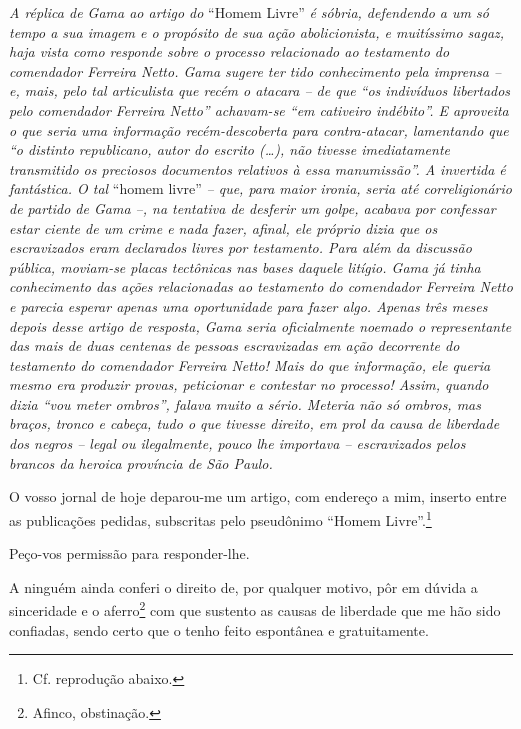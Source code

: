 \begin{didascalia}
\emph{A réplica de Gama ao artigo do} ``Homem Livre'' \emph{é sóbria,
defendendo a um só tempo a sua imagem e o propósito de sua ação
abolicionista, e muitíssimo sagaz, haja vista como responde sobre o
processo relacionado ao testamento do comendador Ferreira Netto. Gama
sugere ter tido conhecimento pela imprensa -- e, mais, pelo tal
articulista que recém o atacara -- de que ``os indivíduos libertados pelo
comendador Ferreira Netto'' achavam-se ``em cativeiro indébito''. E
aproveita o que seria uma informação recém-descoberta para
contra-atacar, lamentando que ``o distinto republicano, autor do escrito
(\ldots{}), não tivesse imediatamente transmitido os preciosos documentos
relativos à essa manumissão''. A invertida é fantástica. O tal} ``homem
livre'' \emph{-- que, para maior ironia, seria até correligionário de
partido de Gama --, na tentativa de desferir um golpe, acabava por
confessar estar ciente de um crime e nada fazer, afinal, ele próprio
dizia que os escravizados eram declarados livres por testamento. Para
além da discussão pública, moviam-se placas tectônicas nas bases daquele
litígio. Gama já tinha conhecimento das ações relacionadas ao testamento
do comendador Ferreira Netto e parecia esperar apenas uma oportunidade
para fazer algo. Apenas três meses depois desse artigo de resposta, Gama
seria oficialmente noemado o representante das mais de duas centenas de
pessoas escravizadas em ação decorrente do testamento do comendador
Ferreira Netto! Mais do que informação, ele queria mesmo era produzir
provas, peticionar e contestar no processo! Assim, quando dizia ``vou
meter ombros'', falava muito a sério. Meteria não só ombros, mas braços,
tronco e cabeça, tudo o que tivesse direito, em prol da causa de
liberdade dos negros -- legal ou ilegalmente, pouco lhe importava --
escravizados pelos brancos da heroica província de São Paulo.}
\end{didascalia}


O vosso jornal de hoje deparou-me um artigo, com endereço a mim, inserto
entre as publicações pedidas, subscritas pelo pseudônimo ``Homem Livre''.\footnote{ Cf. reprodução abaixo.}

Peço-vos permissão para responder-lhe.

A ninguém ainda conferi o direito de, por qualquer motivo, pôr em dúvida
a sinceridade e o aferro\footnote{ Afinco, obstinação.} com que
sustento as causas de liberdade que me hão sido confiadas, sendo certo
que o tenho feito espontânea e gratuitamente.

